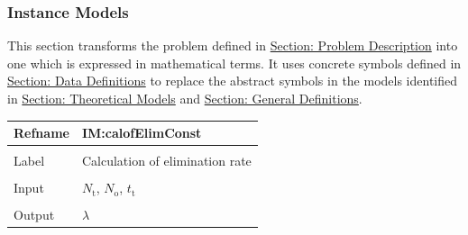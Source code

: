 \documentclass[12pt]{article}
\begin{document}
\subsubsection{Instance Models}
\label{Sec:IMs}
This section transforms the problem defined in \hyperref[Sec:ProbDesc]{Section: Problem Description} into one which is expressed in mathematical terms. It uses concrete symbols defined in \hyperref[Sec:DDs]{Section: Data Definitions} to replace the abstract symbols in the models identified in \hyperref[Sec:TMs]{Section: Theoretical Models} and \hyperref[Sec:GDs]{Section: General Definitions}.

\vspace{\baselineskip}
\noindent
\begin{minipage}{\textwidth}
\begin{tabular}{>{\raggedright}p{}>{\raggedright\arraybackslash}p{}}
\toprule \textbf{Refname} & \textbf{IM:calofElimConst}
\label{IM:calofElimConst}
\\ \midrule \\
Label & Calculation of elimination rate
        
\\ \midrule \\
Input & ${N_{\text{t}}}$, ${N_{\text{o}}}$, ${t_{\text{t}}}$
        
\\ \midrule \\
Output & $λ$
         

\end{tabular}
\end{minipage}
\end{document}
